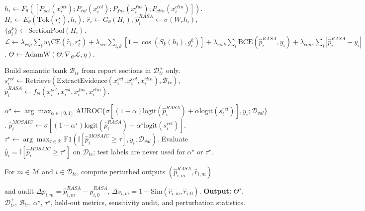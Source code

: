 \documentclass[11pt, a4paper]{article}
\theoremstyle{plain}
\theoremstyle{definition}
\begin{document}
\begin{algorithm}[htbp]
\begin{algorithmic}[1]
\Statex {}
\Repeat
        \State $h_i\leftarrow F_\theta([P_{oct}(x_i^{oct});P_{col}(x_i^{col});P_{fus}(x_i^{fus});P_{clin}(x_i^{clin})])$.
        \State $H_i\leftarrow E_\theta(\mathrm{Tok}(r_i^\star),h_i)$,\quad
        $\hat r_i\leftarrow G_\theta(H_i)$,\quad
        $\hat p_i^{RASA}\leftarrow\sigma(W_rh_i)$,\quad
        $\{g_i^k\}\leftarrow\mathrm{SectionPool}(H_i)$.
        \State $\mathcal{L}\leftarrow
        \lambda_{rep}\sum_i w_i\mathrm{CE}(\hat r_i,r_i^\star)
        +\lambda_{sec}\sum_{i,k}[1-\cos(S_k(h_i),g_i^k)]
        +\lambda_{risk}\sum_i\mathrm{BCE}(\hat p_i^{RASA},y_i)
        +\lambda_{cons}\sum_i|\hat p_i^{RASA}-y_i|$.
        \State $\Theta\leftarrow\mathrm{AdamW}(\Theta,\nabla_\Theta\mathcal{L},\eta)$.
    \EndFor
{}

\Statex {}
\State Build semantic bank $\mathcal{B}_{tr}$ from report sections in $\mathcal{D}_{tr}^{+}$ only.
    \State $s_i^{ret}\leftarrow\mathrm{Retrieve}(\mathrm{ExtractEvidence}(x_i^{oct},x_i^{col},x_i^{clin}),\mathcal{B}_{tr})$,\quad
    $\hat p_i^{RASA}\leftarrow f_\Theta(x_i^{oct},x_i^{col},x_i^{fus},x_i^{clin})$.
\EndFor

\Statex {}
\State $\alpha^\star\leftarrow\arg\max_{\alpha\in[0,1]}\mathrm{AUROC}\{\sigma[(1-\alpha)\mathrm{logit}(\hat p_i^{RASA})+\alpha\mathrm{logit}(s_i^{ret})],y_i;\mathcal{D}_{val}\}$.
\State $\hat p_i^{MOSAIC}\leftarrow\sigma[(1-\alpha^\star)\mathrm{logit}(\hat p_i^{RASA})+\alpha^\star\mathrm{logit}(s_i^{ret})]$.
\State $\tau^\star\leftarrow\arg\max_{\tau\in\mathcal{T}}\mathrm{F1}(\mathbb{I}[\hat p_i^{MOSAIC}\ge\tau],y_i;\mathcal{D}_{val})$.
\State Evaluate $\hat y_i=\mathbb{I}[\hat p_i^{MOSAIC}\ge\tau^\star]$ on $\mathcal{D}_{te}$; test labels are never used for $\alpha^\star$ or $\tau^\star$.

\Statex {}
\State For $m\in\mathcal{M}$ and $i\in\mathcal{D}_{te}$, compute perturbed outputs
$(\hat p_{i,m}^{RASA},\hat r_{i,m})$ 

and audit
$\Delta p_{i,m}=\hat p_{i,m}^{RASA}-\hat p_{i,0}^{RASA}$,
$\Delta s_{i,m}=1-\mathrm{Sim}(\hat r_{i,m},\hat r_{i,0})$.
\State \textbf{Output:} $\Theta^\star$, $\mathcal{D}_{tr}^{+}$, $\mathcal{B}_{tr}$, $\alpha^\star$, $\tau^\star$, held-out metrics, sensitivity audit, and perturbation statistics.

\end{algorithmic}
\end{algorithm}
\end{document}
